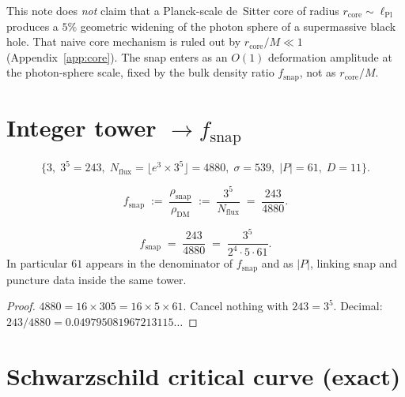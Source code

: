 \begin{remark}
This note does \emph{not} claim that a Planck-scale de~Sitter core of radius
\(r_{\mathrm{core}}\sim\ell_{\mathrm{Pl}}\) produces a \(5\%\) geometric widening of the
photon sphere of a supermassive black hole. That naive core mechanism is
ruled out by \(r_{\mathrm{core}}/M\ll 1\) (Appendix~\ref{app:core}). The snap
enters as an \(O(1)\) deformation amplitude at the photon-sphere scale, fixed
by the bulk density ratio \(f_{\mathrm{snap}}\), not as \(r_{\mathrm{core}}/M\).
\end{remark}

\section{Integer tower \(\to f_{\mathrm{snap}}\)}
\label{sec:tower}

\begin{definition}
\[
\bigl\{
3,\;
3^5=243,\;
N_{\mathrm{flux}}=\lfloor e^3\times 3^5\rfloor=4880,\;
\sigma=539,\;
|P|=61,\;
D=11
\bigr\}.
\]
\end{definition}

\begin{definition}
\label{def:fsnap}
\[
f_{\mathrm{snap}}
\;:=\;
\frac{\rho_{\mathrm{snap}}}{\rho_{\mathrm{DM}}}
\;:=\;
\frac{3^5}{N_{\mathrm{flux}}}
\;=\;
\frac{243}{4880}.
\]
\end{definition}

\begin{lemma}
\label{lem:fsnap-exact}
\[
f_{\mathrm{snap}}
\;=\;
\frac{243}{4880}
\;=\;
\frac{3^5}{2^4\cdot 5\cdot 61}.
\]
In particular \(61\) appears in the denominator of \(f_{\mathrm{snap}}\) and as
\(|P|\), linking snap and puncture data inside the same tower.
\end{lemma}

\begin{proof}
\(4880=16\times 305=16\times 5\times 61\). Cancel nothing with \(243=3^5\).
Decimal: \(243/4880=0.049795081967213115\ldots\)
\end{proof}

\section{Schwarzschild critical curve (exact)}
\label{sec:schw}

